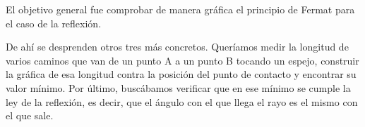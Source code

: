El objetivo general fue comprobar de manera gráfica el principio de Fermat para el caso de la reflexión.

De ahí se desprenden otros tres más concretos. Queríamos medir la longitud de varios caminos que van de un punto A a un punto B tocando un espejo, construir la gráfica de esa longitud contra la posición del punto de contacto y encontrar su valor mínimo. Por último, buscábamos verificar que en ese mínimo se cumple la ley de la reflexión, es decir, que el ángulo con el que llega el rayo es el mismo con el que sale.
